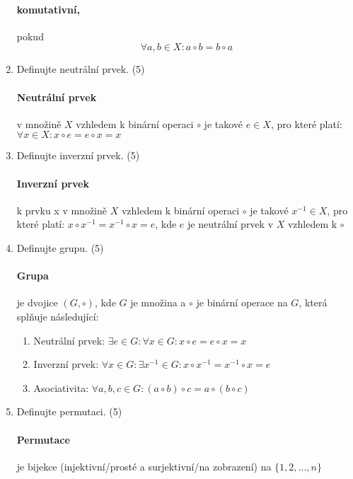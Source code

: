 \documentclass[10pt,a4paper]{article}
\begin{document}
\begin{enumerate}
\paragraph{komutativní,} pokud 
\begin{equation*}
\forall a,b \in X: a \circ b = b \circ a
\end{equation*}
 
\item Definujte neutrální prvek. (5)

\paragraph{Neutrální prvek} v množině $X$ vzhledem k binární operaci $\circ$ je takové $e \in X$, pro které platí: $\forall x \in X: x \circ e = e \circ x = x$

\item Definujte inverzní prvek. (5) 
\paragraph{Inverzní prvek} k prvku x v množině $X$ vzhledem k binární operaci $\circ$ je takové $x^{-1} \in X$, pro které platí: $x \circ x^{-1} = x^{-1} \circ x = e$, kde $e$ je neutrální prvek v $X$ vzhledem k $\circ$

\item Definujte grupu. (5)

\paragraph{Grupa} je dvojice $(G, \circ)$, kde $G$ je množina a $\circ$ je binární operace na $G$, která splňuje následující:

\begin{enumerate}
\item Neutrální prvek: $\exists e \in G: \forall x \in G: x \circ e = e \circ x= x$
\item Inverzní prvek: $\forall x \in G: \exists x^{-1} \in G: x \circ x^{-1} = x^{-1} \circ x = e$
\item Asociativita: $\forall a,b,c \in G:  (a \circ b) \circ c = a \circ (b \circ c)$
\end{enumerate}

\item Definujte permutaci. (5)

\paragraph{Permutace} je bijekce (injektivní/prosté a surjektivní/na zobrazení) na $\{1, 2, ..., n\}$
 

\end{enumerate}
\end{document}

